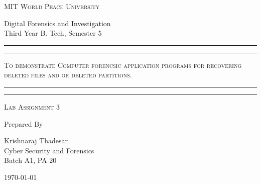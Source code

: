 \documentclass[11pt]{article}
\begin{document}
\begin{titlepage}
    \centering


    \huge\textsc{
        MIT World Peace University
    }\\

    \vspace{0.75\baselineskip} %

    \LARGE{
        Digital Forensics and Investigation\\
        Third Year B. Tech, Semester 5
    }

    \vfill %


    \rule{\textwidth}{1.6pt}\vspace*{-\baselineskip}\vspace*{2pt}
    \rule{\textwidth}{0.6pt}
    \vspace{0.75\baselineskip} %



    \huge{\textsc{
            To demonstrate Computer forencsic application programs for recovering deleted files and or deleted partitions.
        }} \\



    \vspace{0.5\baselineskip} %
    \rule{\textwidth}{0.6pt}\vspace*{-\baselineskip}\vspace*{2.8pt}
    \rule{\textwidth}{1.6pt}

    \vspace{1\baselineskip} %


    \LARGE\textsc{
        Lab Assignment 3
    } %
    \vfill


    Prepared By
    \vspace{0.5\baselineskip} %

    \Large{
        Krishnaraj Thadesar \\
        Cyber Security and Forensics\\
        Batch A1, PA 20
    }


    \vspace{0.5\baselineskip} %
    \today

\end{titlepage}
\end{document}

